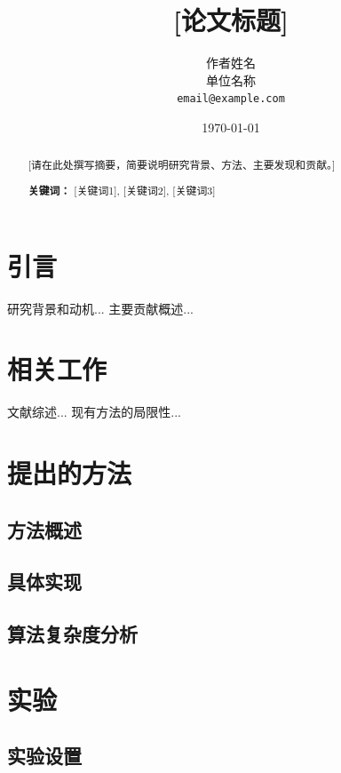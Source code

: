 \documentclass[12pt,a4paper]{article}
\title{[论文标题]}
\author{作者姓名\\[2mm]
  \small 单位名称 \\
  \small \texttt{email@example.com}
}
\date{\today}
\begin{document}
\maketitle

\begin{abstract}
  [请在此处撰写摘要，简要说明研究背景、方法、主要发现和贡献。]

  \vspace{2mm}
  \textbf{关键词：} [关键词1], [关键词2], [关键词3]
\end{abstract}

\section{引言}
\label{sec:introduction}

研究背景和动机...
主要贡献概述...

\section{相关工作}
\label{sec:related_work}

文献综述...
现有方法的局限性...

\section{提出的方法}
\label{sec:methodology}

\subsection{方法概述}
\label{subsec:overview}

\subsection{具体实现}
\label{subsec:implementation}

\subsection{算法复杂度分析}
\label{subsec:complexity}

\section{实验}
\label{sec:experiments}

\subsection{实验设置}
\label{subsec:setup}
\end{document}
